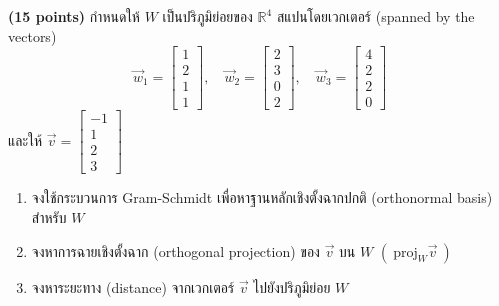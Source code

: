 ﻿\documentclass[12pt, a4paper]{exam}
\begin{document}
\begin{questions}
\question \textbf{(15 points)} กำหนดให้ $W$ เป็นปริภูมิย่อยของ $\mathbb{R}^4$ สแปนโดยเวกเตอร์ (spanned by the vectors)
\[
\vec{w}_1 = \begin{bmatrix} 1 \\ 2 \\ 1 \\ 1 \end{bmatrix}, \quad
\vec{w}_2 = \begin{bmatrix} 2 \\ 3 \\ 0 \\ 2 \end{bmatrix}, \quad
\vec{w}_3 = \begin{bmatrix} 4 \\ 2 \\ 2 \\ 0 \end{bmatrix}
\]
และให้ $\vec{v} = \begin{bmatrix} -1 \\ 1 \\ 2 \\ 3 \end{bmatrix}$
\begin{enumerate}[label=(\alph*)]
    \item จงใช้กระบวนการ Gram-Schmidt เพื่อหาฐานหลักเชิงตั้งฉากปกติ (orthonormal basis) สำหรับ $W$
    \item จงหาการฉายเชิงตั้งฉาก (orthogonal projection) ของ $\vec{v}$ บน $W$ $\left( \ \text{proj}_W \vec{v} \ \right)$
    \item จงหาระยะทาง (distance) จากเวกเตอร์ $\vec{v}$ ไปยังปริภูมิย่อย $W$
\end{enumerate}
\newpage


\end{questions}
\end{document}
